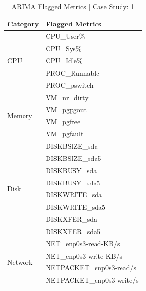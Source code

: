 \documentclass[pdflatex,sn-nature]{sn-jnl}%
\theoremstyle{thmstyleone}%
\theoremstyle{thmstyletwo}%
\theoremstyle{thmstylethree}%
\begin{document}
\begin{table}[tbp]
\centering
\begin{tabular}{ |l|l| }
\hline
\textbf{Category} & \textbf{Flagged Metrics} \\
\hline
\multirow{5}{*}{CPU}
 & CPU\_User\% \\
 & CPU\_Sys\% \\
 & CPU\_Idle\% \\ 
 & PROC\_Runnable \\
 & PROC\_pswitch \\ \hline
\multirow{4}{*}{Memory}
 & VM\_nr\_dirty \\
 & VM\_pgpgout \\
 & VM\_pgfree \\
 & VM\_pgfault \\ \hline
\multirow{8}{*}{Disk}
 & DISKBSIZE\_sda \\
 & DISKBSIZE\_sda5 \\
 & DISKBUSY\_sda \\
 & DISKBUSY\_sda5 \\
 & DISKWRITE\_sda \\
 & DISKWRITE\_sda5 \\
 & DISKXFER\_sda \\
 & DISKXFER\_sda5 \\ \hline
\multirow{4}{*}{Network}
 & NET\_enp0s3-read-KB/s \\
 & NET\_enp0s3-write-KB/s \\
 & NETPACKET\_enp0s3-read/s \\
 & NETPACKET\_enp0s3-write/s \\
\hline
\end{tabular}
\caption{ARIMA Flagged Metrics | Case Study: 1}
\label{arimaflagc1s1}
\end{table}
\end{document}
